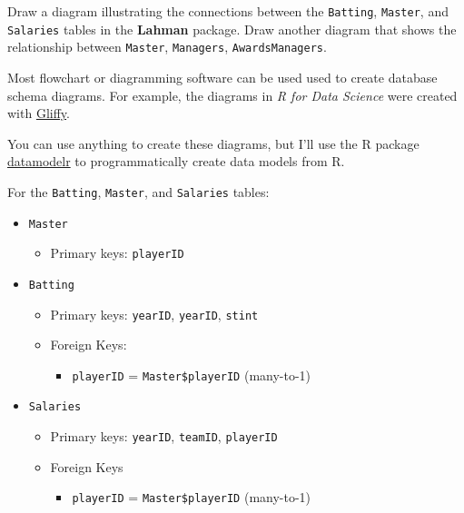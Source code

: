\documentclass[]{book}
\providecommand{\tightlist}{%
  \setlength{\itemsep}{0pt}\setlength{\parskip}{0pt}}
\theoremstyle{plain}
\theoremstyle{remark}
\theoremstyle{definition}
\theoremstyle{definition}
\theoremstyle{definition}
\theoremstyle{remark}
\begin{document}
Draw a diagram illustrating the connections between the
\texttt{Batting}, \texttt{Master}, and \texttt{Salaries} tables in the
\textbf{Lahman} package. Draw another diagram that shows the
relationship between \texttt{Master}, \texttt{Managers},
\texttt{AwardsManagers}.

Most flowchart or diagramming software can be used used to create
database schema diagrams. For example, the diagrams in \emph{R for Data
Science} were created with \href{https://www.gliffy.com/}{Gliffy}.

You can use anything to create these diagrams, but I'll use the R
package \href{https://github.com/bergant/datamodelr}{datamodelr} to
programmatically create data models from R.

For the \texttt{Batting}, \texttt{Master}, and \texttt{Salaries} tables:

\begin{itemize}
\item
  \texttt{Master}

  \begin{itemize}
  \tightlist
  \item
    Primary keys: \texttt{playerID}
  \end{itemize}
\item
  \texttt{Batting}

  \begin{itemize}
  \item
    Primary keys: \texttt{yearID}, \texttt{yearID}, \texttt{stint}
  \item
    Foreign Keys:

    \begin{itemize}
    \tightlist
    \item
      \texttt{playerID} = \texttt{Master\$playerID} (many-to-1)
    \end{itemize}
  \end{itemize}
\item
  \texttt{Salaries}

  \begin{itemize}
  \item
    Primary keys: \texttt{yearID}, \texttt{teamID}, \texttt{playerID}
  \item
    Foreign Keys

    \begin{itemize}
    \tightlist
    \item
      \texttt{playerID} = \texttt{Master\$playerID} (many-to-1)
    \end{itemize}
  \end{itemize}
\end{itemize}
\end{document}
